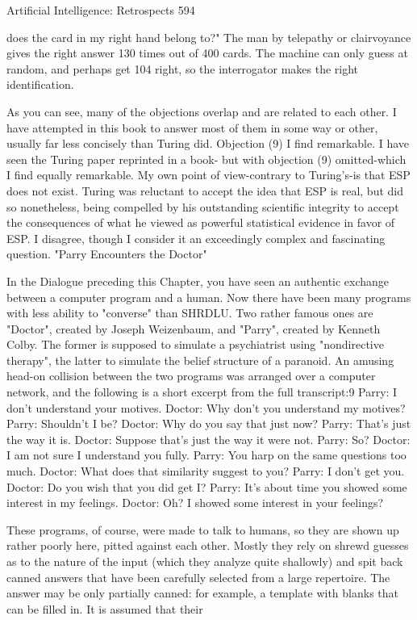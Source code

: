 {Artificial Intelligence: Retrospects                                                           594

     does the card in my right hand belong to?" The man by telepathy or clairvoyance gives
     the right answer 130 times out of 400 cards. The machine can only guess at random, and
     perhaps get 104 right, so the interrogator makes the right identification.

As you can see, many of the objections overlap and are related to each other. I have
attempted in this book to answer most of them in some way or other, usually far less
concisely than Turing did.
   Objection (9) I find remarkable. I have seen the Turing paper reprinted in a book-
   but with objection (9) omitted-which I find equally remarkable. My own point of
   view-contrary to Turing's-is that ESP does not exist. Turing was reluctant to accept
   the idea that ESP is real, but did so nonetheless, being compelled by his outstanding
   scientific integrity to accept the consequences of what he viewed as powerful
   statistical evidence in favor of ESP. I disagree, though I consider it an exceedingly
   complex and fascinating question.
                               "Parry Encounters the Doctor"

In the Dialogue preceding this Chapter, you have seen an authentic exchange between
a computer program and a human. Now there have been many programs with less
ability to "converse" than SHRDLU. Two rather famous ones are "Doctor", created by
Joseph Weizenbaum, and "Parry", created by Kenneth Colby. The former is supposed
to simulate a psychiatrist using "nondirective therapy", the latter to simulate the belief
structure of a paranoid. An amusing head-on collision between the two programs was
arranged over a computer network, and the following is a short excerpt from the full
transcript:9
       Parry: I don't understand your motives.
       Doctor: Why don't you understand my motives?
       Parry: Shouldn't I be?
       Doctor: Why do you say that just now?
       Parry: That's just the way it is.
       Doctor: Suppose that's just the way it were not.
       Parry: So?
       Doctor: I am not sure I understand you fully.
       Parry: You harp on the same questions too much.
       Doctor: What does that similarity suggest to you?
       Parry: I don't get you.
       Doctor: Do you wish that you did get I?
       Parry: It's about time you showed some interest in my feelings.
       Doctor: Oh? I showed some interest in your feelings?

These programs, of course, were made to talk to humans, so they are shown up rather
poorly here, pitted against each other. Mostly they rely on shrewd guesses as to the
nature of the input (which they analyze quite shallowly) and spit back canned answers
that have been carefully selected from a large repertoire. The answer may be only
partially canned: for example, a template with blanks that can be filled in. It is
assumed that their




}
